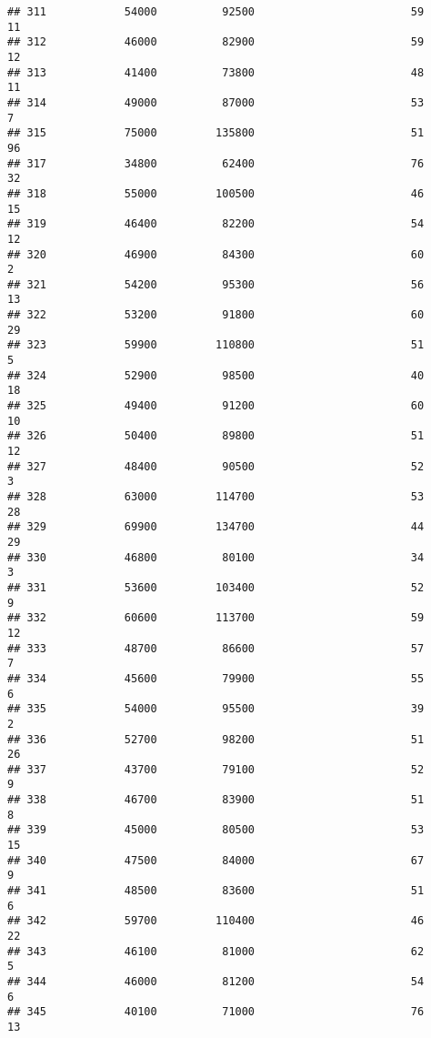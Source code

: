 \documentclass[
]{article}
\begin{document}
\begin{verbatim}
## 311            54000          92500                        59           11
## 312            46000          82900                        59           12
## 313            41400          73800                        48           11
## 314            49000          87000                        53            7
## 315            75000         135800                        51           96
## 317            34800          62400                        76           32
## 318            55000         100500                        46           15
## 319            46400          82200                        54           12
## 320            46900          84300                        60            2
## 321            54200          95300                        56           13
## 322            53200          91800                        60           29
## 323            59900         110800                        51            5
## 324            52900          98500                        40           18
## 325            49400          91200                        60           10
## 326            50400          89800                        51           12
## 327            48400          90500                        52            3
## 328            63000         114700                        53           28
## 329            69900         134700                        44           29
## 330            46800          80100                        34            3
## 331            53600         103400                        52            9
## 332            60600         113700                        59           12
## 333            48700          86600                        57            7
## 334            45600          79900                        55            6
## 335            54000          95500                        39            2
## 336            52700          98200                        51           26
## 337            43700          79100                        52            9
## 338            46700          83900                        51            8
## 339            45000          80500                        53           15
## 340            47500          84000                        67            9
## 341            48500          83600                        51            6
## 342            59700         110400                        46           22
## 343            46100          81000                        62            5
## 344            46000          81200                        54            6
## 345            40100          71000                        76           13

\end{verbatim}
\end{document}
